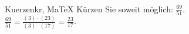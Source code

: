 \begin{MAufgabe}{Kuerzen}{kr, MaTeX}
K\"urzen Sie soweit m\"oglich: $\frac{69}{51}$.\\ 
\ifLsg\MLoesung
\quad $\frac{69}{51}=\frac{(3)\cdot(23)}{(3)\cdot(17)}=\frac{23}{17}$.\else\relax\fi
 \end{MAufgabe}